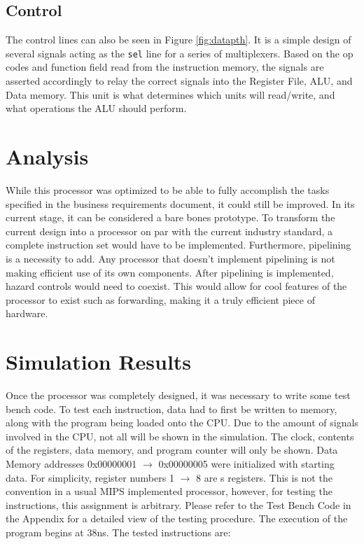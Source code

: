 \documentclass[12pt]{article}
\begin{document}
\subsection{Control}
The control lines can also be seen in Figure \ref{fig:datapth}. It is a simple design of several signals acting as the \texttt{sel} line for a series of multiplexers. Based on the op codes and function field read from the instruction memory, the signals are asserted accordingly to relay the correct signals into the Register File, ALU, and Data memory. This unit is what determines which units will read/write, and what operations the ALU should perform.
\section{Analysis}
While this processor was optimized to be able to fully accomplish the tasks specified in the business requirements document, it could still be improved. In its current stage, it can be considered a bare bones prototype. To transform the current design into a processor on par with the current industry standard, a complete instruction set would have to be implemented. Furthermore, pipelining is a necessity to add. Any processor that doesn't implement pipelining is not making efficient use of its own components. After pipelining is implemented, hazard controls would need to coexist. This would allow for cool features of the processor to exist such as forwarding, making it a truly efficient piece of hardware.
\section{Simulation Results}
Once the processor was completely designed, it was necessary to write some test bench code. To test each instruction, data had to first be written to memory, along with the program being loaded onto the CPU. Due to the amount of signals involved in the CPU, not all will be shown in the simulation. The clock, contents of the registers, data memory, and program counter will only be shown. Data Memory addresses 0x00000001 $\to$ 0x00000005 were initialized with starting data. For simplicity, register numbers 1 $\to$ 8 are s registers. This is not the convention in a usual MIPS implemented processor, however, for testing the instructions, this assignment is arbitrary. Please refer to the Test Bench Code in the Appendix for a detailed view of the testing procedure. The execution of the program begins at 38ns. The tested instructions are:
\end{document}
